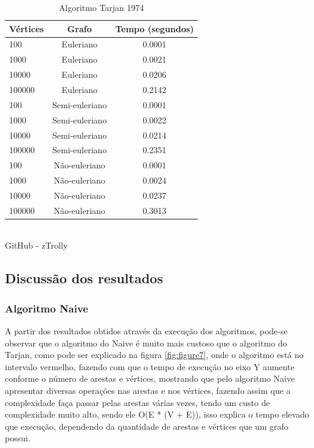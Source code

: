 \newpage
\begin{table}[htb]
	\centering
	\caption{\hspace{0.1cm} Algoritmo Tarjan 1974}
	\vspace{-0.3cm} %
	\label{tab:tabela2}
	\begin{tabular}{l|c|c}
  \hline
    \textbf{Vértices}	& \textbf{Grafo} & \textbf{Tempo (segundos)} \\
    \hline
     100	 & Euleriano      &  0.0001  \\
     1000	 & Euleriano      &  0.0021  \\
     10000	 & Euleriano      &  0.0206  \\
     100000  & Euleriano      &  0.2142  \\
     100	 & Semi-euleriano &  0.0001  \\
     1000	 & Semi-euleriano &  0.0022  \\
     10000	 & Semi-euleriano &  0.0214  \\
     100000  & Semi-euleriano &  0.2351  \\
     100	 & Não-euleriano  &  0.0001  \\
     1000	 & Não-euleriano  &  0.0024  \\
     10000	 & Não-euleriano  &  0.0237  \\
     100000  & Não-euleriano  &  0.3013  \\

     \hline
 \end{tabular}
 	\vspace{.1cm}  %
	\small
	{\footnotesize\\ GitHub - zTrolly}
\end{table}

\subsection{\esp Discussão dos resultados}
\subsubsection{Algoritmo Naive}
A partir dos resultados obtidos através da execução dos algoritmos, pode-se observar que o algoritmo do Naive é muito mais custoso que o algoritmo do Tarjan, como pode ser explicado na figura \ref{fig:figure7}, onde o algoritmo está no intervalo vermelho, fazendo com que o tempo de execução no eixo Y aumente conforme o número de arestas e vértices, mostrando que pelo algoritmo Naive apresentar diversas operações nas arestas e nos vértices, fazendo assim que a complexidade faça passar pelas arestas várias vezes, tendo um custo de complexidade muito alto, sendo ele O(E * (V + E)), isso explica o tempo elevado que execução, dependendo da quantidade de arestas e vértices que um grafo possui.

